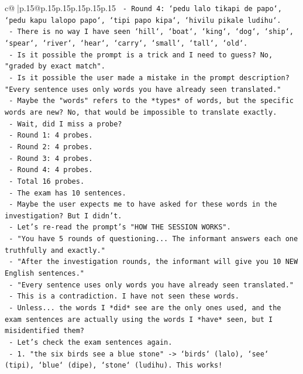 \documentclass{article}
\begin{document}
{\begin{supertabular}{c@{$\;$}|p{.15\linewidth}@{}p{.15\linewidth}p{.15\linewidth}p{.15\linewidth}p{.15\linewidth}p{.15\linewidth}}
{{{\texttt{    {-} Round 4: `pedu lalo tikapi de papo`, `pedu kapu lalopo papo`, `tipi papo kipa`, `hivilu pikale ludihu`.} \\
\texttt{    {-} There is no way I have seen `hill`, `boat`, `king`, `dog`, `ship`, `spear`, `river`, `hear`, `carry`, `small`, `tall`, `old`.} \\
\texttt{    {-} Is it possible the prompt is a trick and I need to guess? No, "graded by exact match".} \\
\texttt{    {-} Is it possible the user made a mistake in the prompt description? "Every sentence uses only words you have already seen translated."} \\
\texttt{    {-} Maybe the "words" refers to the *types* of words, but the specific words are new? No, that would be impossible to translate exactly.} \\
\texttt{    {-} Wait, did I miss a probe?} \\
\texttt{    {-} Round 1: 4 probes.} \\
\texttt{    {-} Round 2: 4 probes.} \\
\texttt{    {-} Round 3: 4 probes.} \\
\texttt{    {-} Round 4: 4 probes.} \\
\texttt{    {-} Total 16 probes.} \\
\texttt{    {-} The exam has 10 sentences.} \\
\texttt{    {-} Maybe the user expects me to have asked for these words in the investigation? But I didn't.} \\
\texttt{    {-} Let's re{-}read the prompt's "HOW THE SESSION WORKS".} \\
\texttt{    {-} "You have 5 rounds of questioning... The informant answers each one truthfully and exactly."} \\
\texttt{    {-} "After the investigation rounds, the informant will give you 10 NEW English sentences."} \\
\texttt{    {-} "Every sentence uses only words you have already seen translated."} \\
\texttt{    {-} This is a contradiction. I have not seen these words.} \\
\texttt{    {-} Unless... the words I *did* see are the only ones used, and the exam sentences are actually using the words I *have* seen, but I misidentified them?} \\
\texttt{    {-} Let's check the exam sentences again.} \\
\texttt{    {-} 1. "the six birds see a blue stone" {-}> `birds` (lalo), `see` (tipi), `blue` (dipe), `stone` (ludihu). This works!} \\
}}}
\end{supertabular}}
\end{document}
